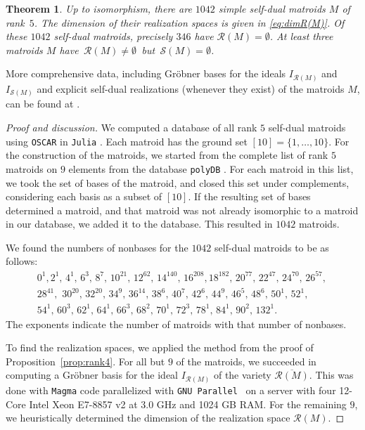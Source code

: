 \documentclass[12pt]{extarticle}
\newtheorem{theorem}{Theorem}
\theoremstyle{definition}
\numberwithin{theorem}{section}
\theoremstyle{plain}\newtheorem{ithm}{Theorem}
\begin{document}
\begin{theorem} \label{thm:1042} Up to isomorphism, there are $1042$
 simple self-dual matroids $M$ of rank~$5$. The dimension of their realization spaces is given in \eqref{eq:dimR(M)}.
Of these $1042$ self-dual matroids, precisely $346$ have $\mathcal{R}(M) = \emptyset$. 
At least three matroids $M$  have $\,\mathcal{R}(M) \not= \emptyset\,$ but $\,\mathcal{S}(M) = \emptyset$.
\end{theorem}

More comprehensive data, including Gr\"obner bases for  the ideals $I_{\mathcal{R}(M)}$
and $I_{\mathcal{S}(M)}$ and explicit
 self-dual realizations (whenever they exist) of the
  matroids $M$, can be found at \cite{MathRepo}.


\begin{proof}[Proof and discussion]
We computed a database of all rank $5$ self-dual matroids using {\tt OSCAR} in {\tt Julia} \cite{julia,oscar}.
Each matroid has the ground set $[10] = \{1, \dots, 10\}$.
For the construction of the matroids, we started from the complete list of rank $5$ matroids on $9$ elements from the database  {\tt polyDB} \cite{Paf}.
For each matroid in this list, we took the set of bases of the matroid, and closed this set under complements, considering each basis as a subset of $[10]$. If the resulting set of bases determined a matroid, and that matroid was not already isomorphic to a matroid in our database, we added it to the database. 
 This resulted in $1042$  matroids.
 
 We found the numbers  of nonbases for the $1042$ self-dual matroids to be as follows:
\begin{equation}
\label{eq:rank5nonbases}  \begin{matrix}
0^1, 2^1,\, 4^1, \, 6^3, \,8^7, \,10^{21},\, 12^{62}, \,14^{140}, \, 16^{208}, 
18^{182}, \, 20^{77}, \,22^{47},\, 24^{70},\, 26^{57}, \,\\ 28^{41}, \,
 \,30^{20}, \, 32^{20},\, 34^9, \, 
36^{14},\, 38^6,\, 40^7,\, 42^6,\, 44^9,\, 46^5,\, 48^6,\, 50^1,\, 
 52^1, \, \\ 54^1, \, 60^ 3,\, 62^1,\, 
64^1,\, 66^3,\, 68^2,\, 70^1,\, 72^3,\, 78^1,\, 84^1,\, 90^2,\, 132^1.
\end{matrix}
\end{equation}
The exponents indicate the number of matroids with that number of nonbases.


To find the realization spaces, we applied the  method from the proof
of Proposition~\ref{prop:rank4}. For all but $9$ of the matroids, we  succeeded in computing
a Gr\"obner basis for the ideal $I_{\mathcal{R}(M)}$ 
of the variety $\overline{\mathcal{R}(M)}$. This was done with
{\tt Magma} code parallelized with \texttt{GNU Parallel}~\cite{GNUparallel} on a server with four 12-Core Intel Xeon E7-8857 v2 at 3.0 GHz
and 1024 GB RAM. For the remaining $9$, we heuristically determined the dimension 
of the realization space $\mathcal{R}(M)$.


\end{proof}
\end{document}
